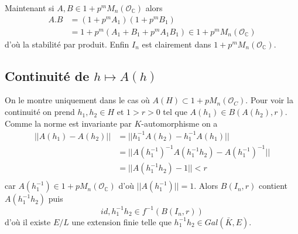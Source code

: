 \documentclass[a4paper,12pt]{article}
\newcommand{\C}{\mathbb{C}}
\newcommand{\Or}{\mathcal{O}}
\theoremstyle{plain}
\theoremstyle{definition}
\theoremstyle{remark}
\begin{document}
Maintenant si $A,B\in 1+p^mM_n(\Or_\C)$ alors 
\begin{align*}
  A.B&=(1+p^mA_1)(1+p^mB_1)\\
     &=1+p^m(A_1+B_1+p^mA_1B_1)\in 1+p^mM_n(\Or_\C)
\end{align*}
d'où la stabilité par produit. Enfin $I_n$ est clairement dans
$1+p^mM_n(\Or_\C)$.

\subsection{Continuité de $h\mapsto A(h)$}
On le montre uniquement dans le cas où $A(H)\subset 1+pM_n(\Or_C)$.
Pour voir la continuité on prend
$h_1,h_2\in H$ et $1>r>0$ tel que $A(h_1)\in B(A(h_2),r)$. Comme la
norme est invariante par $K$-automorphisme on a 
\begin{align*}
  ||A(h_1)-A(h_2)||&=||h_1^{-1}A(h_2)-h_1^{-1}A(h_1)||\\
		   &=||A(h_1^{-1})^{-1}A(h_1^{-1}h_2)-A(h_1^{-1})^{-1}||\\
		   &=||A(h_1^{-1}h_2)-1||<r\\
\end{align*}
car $A(h_1^{-1})\in 1+pM_n(\Or_\C)$ d'où $||A(h_1^{-1})||=1$.
Alors $B(I_n,r)$ contient $A(h_1^{-1}h_2)$ puis
\[id,h_1^{-1}h_2\in f^{-1}(B(I_n,r))\]
d'où il existe $E/L$ une extension finie telle que 
$h_1^{-1}h_2\in Gal(\bar K,E)$.
\end{document}
